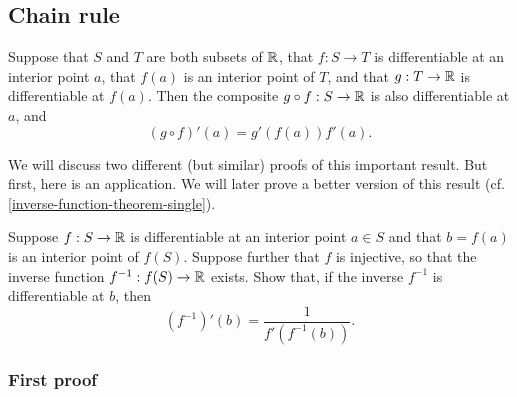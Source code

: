 \subsection{Chain rule} \label{chain-rule-single-section}

\begin{proposition} \label{chain-rule-single} 
	Suppose that $S$ and $T$ are both subsets of $\mathbb{R}$, that $f : S \to T$ is differentiable at an interior point $a$, that $f(a)$ is an interior point of $T$, and that $g : T \to \mathbb{R}$ is differentiable at $f(a)$. Then the composite $g \circ f : S \to \mathbb{R}$ is also differentiable at $a$, and 
	\[ (g \circ f)'(a) = g'(f(a))f'(a). \]
\end{proposition}

We will discuss two different (but similar) proofs of this important result. But first, here is an application. We will later prove a better version of this result (cf. \cref{inverse-function-theorem-single}). 

\begin{exercise} \label{inverse-derivative} 
	Suppose $f : S \to \mathbb{R}$ is differentiable at an interior point $a \in S$ and that $b = f(a)$ is an interior point of $f(S)$. Suppose further that $f$ is injective, so that the inverse function $f^{-1} : f(S) \to \mathbb{R}$ exists. Show that, if the inverse $f^{-1}$ is differentiable at $b$, then 
	\[ (f^{-1})'(b) = \frac{1}{f'(f^{-1}(b))}. \]
\end{exercise}

\subsubsection*{First proof}

